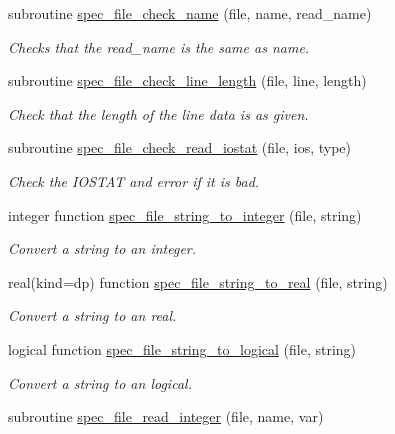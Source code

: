 \begin{DoxyCompactItemize}
subroutine \mbox{\hyperlink{namespacepmc__spec__file_adf9e4ee5ff71cbe408fea47ec1342414}{spec\+\_\+file\+\_\+check\+\_\+name}} (file, name, read\+\_\+name)
\begin{DoxyCompactList}\small\item\em Checks that the read\+\_\+name is the same as name. \end{DoxyCompactList}\item 
subroutine \mbox{\hyperlink{namespacepmc__spec__file_a397be4f827824ae1c71b46d3f93060c1}{spec\+\_\+file\+\_\+check\+\_\+line\+\_\+length}} (file, line, length)
\begin{DoxyCompactList}\small\item\em Check that the length of the line data is as given. \end{DoxyCompactList}\item 
subroutine \mbox{\hyperlink{namespacepmc__spec__file_ad019e654ad6a62c42f62af8ce5b1c0b8}{spec\+\_\+file\+\_\+check\+\_\+read\+\_\+iostat}} (file, ios, type)
\begin{DoxyCompactList}\small\item\em Check the I\+O\+S\+T\+AT and error if it is bad. \end{DoxyCompactList}\item 
integer function \mbox{\hyperlink{namespacepmc__spec__file_a1c773de3382d01f1bd47ede8e0e78717}{spec\+\_\+file\+\_\+string\+\_\+to\+\_\+integer}} (file, string)
\begin{DoxyCompactList}\small\item\em Convert a string to an integer. \end{DoxyCompactList}\item 
real(kind=dp) function \mbox{\hyperlink{namespacepmc__spec__file_aa9a3ea2d69a3e47a827dc9b91baa559a}{spec\+\_\+file\+\_\+string\+\_\+to\+\_\+real}} (file, string)
\begin{DoxyCompactList}\small\item\em Convert a string to an real. \end{DoxyCompactList}\item 
logical function \mbox{\hyperlink{namespacepmc__spec__file_a3e48df131612d60a35f57a85ae708089}{spec\+\_\+file\+\_\+string\+\_\+to\+\_\+logical}} (file, string)
\begin{DoxyCompactList}\small\item\em Convert a string to an logical. \end{DoxyCompactList}\item 
subroutine \mbox{\hyperlink{namespacepmc__spec__file_abee8b3b0c53f2d8484854da58d49901e}{spec\+\_\+file\+\_\+read\+\_\+integer}} (file, name, var)

\end{DoxyCompactItemize}
